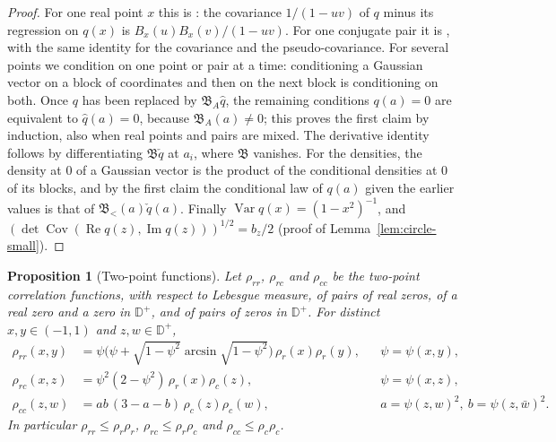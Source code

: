 \documentclass[11pt]{amsart}
\newtheorem{proposition}[theorem]{Proposition}
\theoremstyle{definition}
\theoremstyle{remark}
\numberwithin{equation}{section}
\newcommand{\D}{\mathbb{D}}
\DeclareMathOperator{\re}{Re}
\DeclareMathOperator{\im}{Im}
\begin{document}
\begin{proof}
For one real point $x$ this is \cite[Lemma~4.2]{MS}: the covariance $1/(1-uv)$ of $q$ minus its regression on $q(x)$ is $B_x(u)B_x(v)/(1-uv)$. For one conjugate pair it is \cite[Lemma~7.2]{MS}, with the same identity for the covariance and the pseudo-covariance. For several points we condition on one point or pair at a time: conditioning a Gaussian vector on a block of coordinates and then on the next block is conditioning on both. Once $q$ has been replaced by $\mathfrak B_A\hat q$, the remaining conditions $q(a)=0$ are equivalent to $\hat q(a)=0$, because $\mathfrak B_A(a)\ne0$; this proves the first claim by induction, also when real points and pairs are mixed. The derivative identity follows by differentiating $\mathfrak B\check q$ at $a_i$, where $\mathfrak B$ vanishes. For the densities, the density at $0$ of a Gaussian vector is the product of the conditional densities at $0$ of its blocks, and by the first claim the conditional law of $q(a)$ given the earlier values is that of $\mathfrak B_<(a)\check q(a)$. Finally $\operatorname{Var}q(x)=(1-x^2)^{-1}$, and $(\det\operatorname{Cov}(\re q(z),\im q(z)))^{1/2}=b_z/2$ (proof of Lemma~\ref{lem:circle-small}).
\end{proof}

\begin{proposition}[Two-point functions]\label{prop:twopoint}
Let $\rho_{rr}$, $\rho_{rc}$ and $\rho_{cc}$ be the two-point correlation functions, with respect to Lebesgue measure, of pairs of real zeros, of a real zero and a zero in $\D^+$, and of pairs of zeros in $\D^+$. For distinct $x,y\in(-1,1)$ and $z,w\in\D^+$,
\begin{equation}\label{eq:twopoint}
\begin{aligned}
\rho_{rr}(x,y)&=\psi\bigl(\psi+\sqrt{1-\psi^2}\arcsin\sqrt{1-\psi^2}\bigr)\,\rho_r(x)\rho_r(y),&&\psi=\psi(x,y),\\
\rho_{rc}(x,z)&=\psi^2(2-\psi^2)\,\rho_r(x)\rho_c(z),&&\psi=\psi(x,z),\\
\rho_{cc}(z,w)&=ab\,(3-a-b)\,\rho_c(z)\rho_c(w),&&a=\psi(z,w)^2,\ b=\psi(z,\bar w)^2 .
\end{aligned}
\end{equation}
In particular $\rho_{rr}\le\rho_r\rho_r$, $\rho_{rc}\le\rho_r\rho_c$ and $\rho_{cc}\le\rho_c\rho_c$.
\end{proposition}
\end{document}
